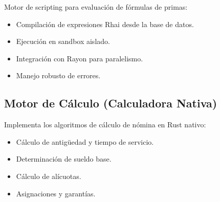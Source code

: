 Motor de scripting para evaluación de fórmulas de primas:

\begin{itemize}
    \item Compilación de expresiones Rhai desde la base de datos.
    \item Ejecución en sandbox aislado.
    \item Integración con Rayon para paralelismo.
    \item Manejo robusto de errores.
\end{itemize}

\bigskip

\subsection{Motor de Cálculo (Calculadora Nativa)}

Implementa los algoritmos de cálculo de nómina en Rust nativo:

\begin{itemize}
    \item Cálculo de antigüedad y tiempo de servicio.
    \item Determinación de sueldo base.
    \item Cálculo de alícuotas.
    \item Asignaciones y garantías.
\end{itemize}

\vfill
\newpage
